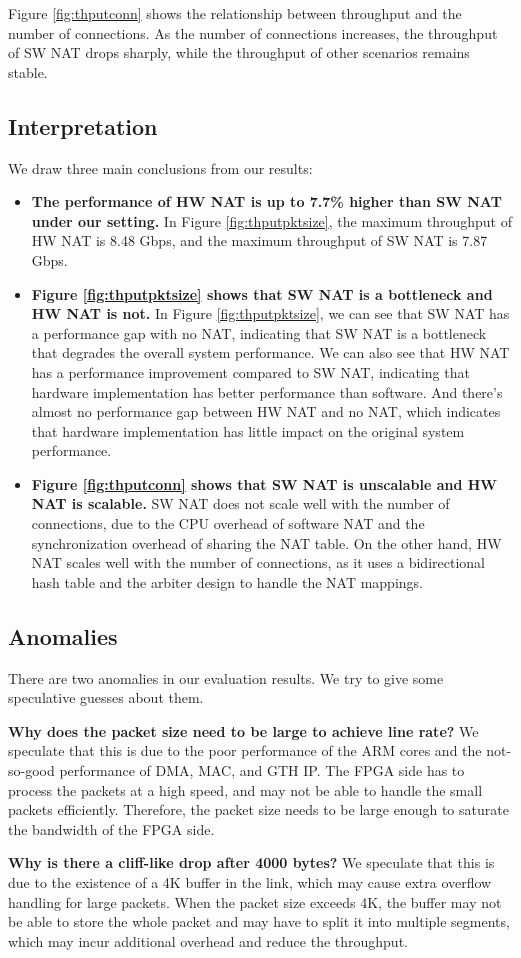 Figure \ref{fig:thputconn} shows the relationship between throughput and the number of connections. As the number of connections increases, the throughput of SW NAT drops sharply, while the throughput of other scenarios remains stable. 

\subsection{Interpretation}
We draw three main conclusions from our results:
\begin{itemize}
    \item \textbf{The performance of HW NAT is up to 7.7\% higher than SW NAT under our setting.} In Figure \ref{fig:thputpktsize}, the maximum throughput of HW NAT is 8.48 Gbps, and the maximum throughput of SW NAT is 7.87 Gbps.
    \item \textbf{Figure \ref{fig:thputpktsize} shows that SW NAT is a bottleneck and HW NAT is not.}
    In Figure \ref{fig:thputpktsize}, we can see that SW NAT has a performance gap with no NAT, indicating that SW NAT is a bottleneck that degrades the overall system performance. We can also see that HW NAT has a performance improvement compared to SW NAT, indicating that hardware implementation has better performance than software. And there's almost no performance gap between HW NAT and no NAT, which indicates that hardware implementation has little impact on the original system performance.
    \item \textbf{Figure \ref{fig:thputconn} shows that SW NAT is unscalable and HW NAT is scalable.}
    SW NAT does not scale well with the number of connections, due to the CPU overhead of software NAT and the synchronization overhead of sharing the NAT table. On the other hand, HW NAT scales well with the number of connections, as it uses a bidirectional hash table and the arbiter design to handle the NAT mappings.
\end{itemize}






\subsection{Anomalies}
There are two anomalies in our evaluation results. We try to give some speculative guesses about them.

\textbf{Why does the packet size need to be large to achieve line rate?} We speculate that this is due to the poor performance of the ARM cores and the not-so-good performance of DMA, MAC, and GTH IP. The FPGA side has to process the packets at a high speed, and may not be able to handle the small packets efficiently. Therefore, the packet size needs to be large enough to saturate the bandwidth of the FPGA side.

\textbf{Why is there a cliff-like drop after 4000 bytes?} We speculate that this is due to the existence of a 4K buffer in the link, which may cause extra overflow handling for large packets. When the packet size exceeds 4K, the buffer may not be able to store the whole packet and may have to split it into multiple segments, which may incur additional overhead and reduce the throughput.



